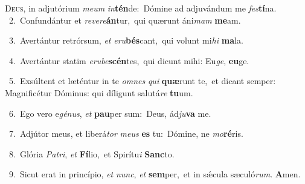 \lettrine{\initial\textcolor{\initialcolor}{D}}{eus,} in adjutórium \textit{me}\-\textit{um} \textit{in}\-\textbf{tén}de:~\star Dómine ad adjuvándum me \textit{fes}\-\textbf{tí}na.\\
{\numbfont\textcolor{\numbcolor}{~2.}}~Confundántur et \textit{re}\-\textit{ve}\textit{re}\textbf{án}tur,~\star qui quærunt áni\textit{mam} \textbf{me}\-am.\par
{\numbfont\textcolor{\numbcolor}{~3.}}~Avertántur retrórsum, \textit{et} \textit{e}\-\textit{ru}\textbf{bés}cant,~\star qui volunt mi\textit{hi} \textbf{ma}\-la.\par
{\numbfont\textcolor{\numbcolor}{~4.}}~Avertántur statim \textit{e}\-\textit{ru}\textit{be}\textbf{scén}tes,~\star qui dicunt mihi: Eu\-\textit{ge}\-, \textbf{eu}\-ge.\par
{\numbfont\textcolor{\numbcolor}{~5.}}~Exsúltent et læténtur in te \textit{om}\-\textit{nes} \textit{qui} \textbf{quæ}\-runt te,~\star et dicant semper: Magnificétur Dóminus: qui díligunt salutá\textit{re} \textbf{tu}\-um.\par
{\numbfont\textcolor{\numbcolor}{~6.}}~Ego vero e\-\textit{gé}\-\textit{nus}, \textit{et} \textbf{pau}\-per sum:~\star Deus, ád\-\textit{ju}\-\textbf{va} me.\par
{\numbfont\textcolor{\numbcolor}{~7.}}~Adjútor meus, et liberá\textit{tor} \textit{me}\-\textit{us} \textbf{es} tu:~\star Dómine, ne \textit{mo}\-\textbf{ré}ris.\par
{\numbfont\textcolor{\numbcolor}{~8.}}~Glória \textit{Pa}\-\textit{tri}, \textit{et} \textbf{Fí}\-lio,~\star et Spirítu\textit{i} \textbf{Sanc}\-to.\par
{\numbfont\textcolor{\numbcolor}{~9.}}~Sicut erat in princípio, \textit{et} \textit{nunc}\-, \textit{et} \textbf{sem}\-per,~\star et in sǽcula sæculó\-\textit{rum}\-. \textbf{A}\-men.\par
